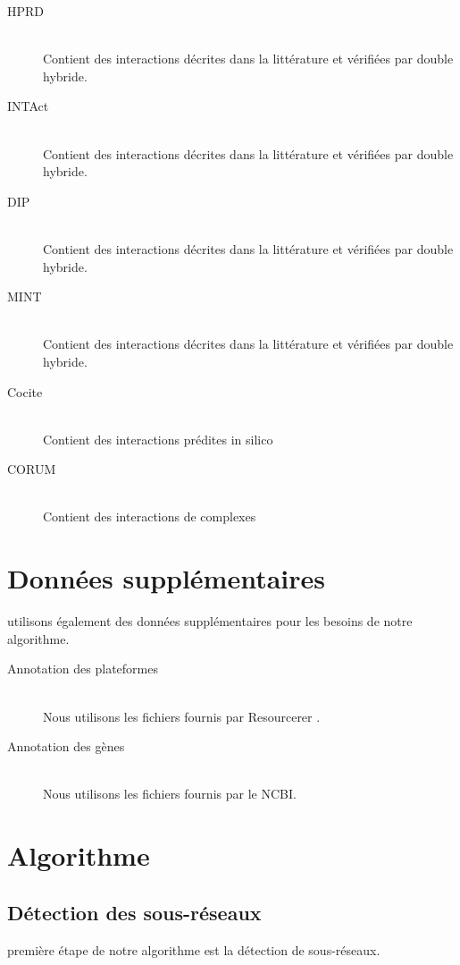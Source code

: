       \begin{description}
        \item[HPRD]   \hfill \\
          Contient des interactions décrites dans la littérature et vérifiées par double hybride.
        \item[INTAct] \hfill \\
          Contient des interactions décrites dans la littérature et vérifiées par double hybride.
        \item[DIP]    \hfill \\
          Contient des interactions décrites dans la littérature et vérifiées par double hybride.
        \item[MINT]   \hfill \\
          Contient des interactions décrites dans la littérature et vérifiées par double hybride.
        \item[Cocite] \hfill \\
          Contient des interactions prédites in silico
        \item[CORUM]  \hfill \\
          Contient des interactions de complexes
      \end{description}

  \section{\textcolor{mygreen}{Données supplémentaires}}
     utilisons également des données supplémentaires pour les besoins de notre algorithme.
      \begin{description}
        \item[Annotation des plateformes] \hfill \\
          Nous utilisons les fichiers fournis par Resourcerer \citet{Tsai2001}.
        \item[Annotation des gènes]       \hfill \\
          Nous utilisons les fichiers fournis par le \acs{NCBI}.
      \end{description}    

  \section{\textcolor{mygreen}{Algorithme}}

    \subsection{\textcolor{mygreen}{Détection des sous-réseaux}}
       première étape de notre algorithme est la détection de sous-réseaux.

